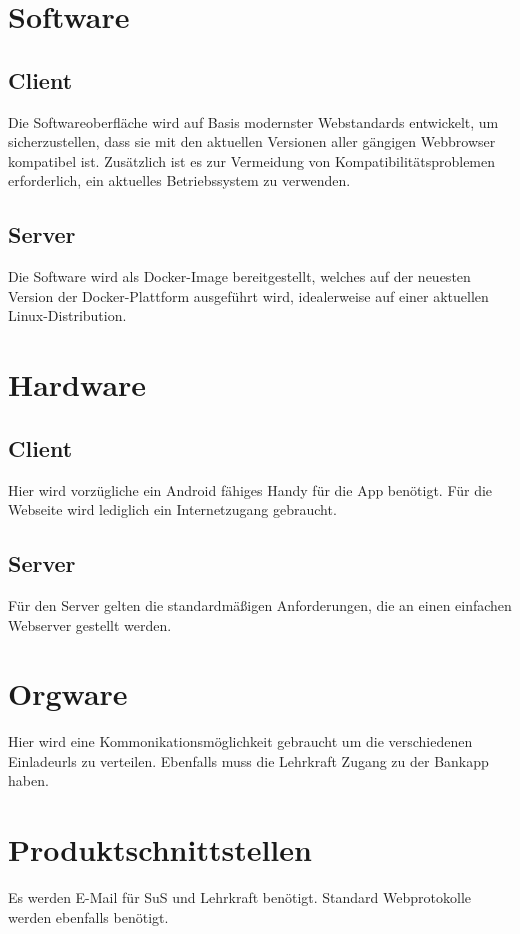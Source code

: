 \section{Software}
\subsection{Client}
Die Softwareoberfläche wird auf Basis modernster Webstandards entwickelt, um sicherzustellen, dass sie mit den aktuellen Versionen aller gängigen Webbrowser kompatibel ist. Zusätzlich ist es zur Vermeidung von Kompatibilitätsproblemen erforderlich, ein aktuelles Betriebssystem zu verwenden.
\subsection{Server}
Die Software wird als Docker-Image bereitgestellt, welches auf der neuesten Version der Docker-Plattform ausgeführt wird, idealerweise auf einer aktuellen Linux-Distribution.
\section{Hardware}
\subsection{Client}
Hier wird vorz\"ugliche ein Android f\"ahiges Handy f\"ur die App ben\"otigt. F\"ur die Webseite wird lediglich ein Internetzugang gebraucht.
\subsection{Server}
Für den Server gelten die standardmäßigen Anforderungen, die an einen einfachen Webserver gestellt werden.
\section{Orgware}
Hier wird eine Kommonikationsm\"oglichkeit gebraucht um die verschiedenen Einladeurls zu verteilen. Ebenfalls muss die Lehrkraft Zugang zu der Bankapp haben.
\section{Produktschnittstellen}
Es werden E-Mail f\"ur SuS und Lehrkraft ben\"otigt. Standard Webprotokolle werden ebenfalls ben\"otigt.

